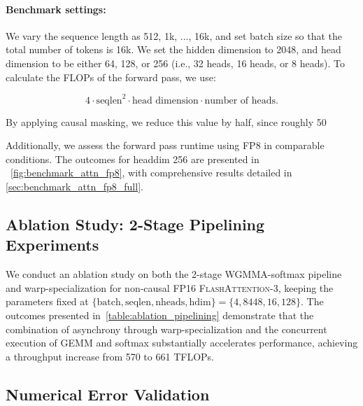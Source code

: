 \begin{enumerate}
\paragraph{Benchmark settings:} We vary the sequence length as 512, 1k, ..., 16k, and set batch size so that the total number of tokens is 16k. We set the hidden dimension to 2048, and head dimension to be either 64, 128, or 256 (i.e., 32 heads, 16 heads, or 8 heads). To calculate the FLOPs of the forward pass, we use:

\begin{equation*}
  4 \cdot \text{seqlen}^2 \cdot \text{head dimension} \cdot \text{number of heads}.
\end{equation*}

By applying causal masking, we reduce this value by half, since roughly 50%

Additionally, we assess the forward pass runtime using FP8 in comparable conditions. The outcomes for headdim 256 are presented in ~\cref{fig:benchmark_attn_fp8}, with comprehensive results detailed in \cref{sec:benchmark_attn_fp8_full}.

\subsection{Ablation Study: 2-Stage Pipelining Experiments}
\label{sec:2-stage-pipelining-experiments}

We conduct an ablation study on both the 2-stage WGMMA-softmax pipeline and warp-specialization for non-causal FP16 \textsc{FlashAttention-3}, keeping the parameters fixed at $\{\text{batch}, \text{seqlen}, \text{nheads}, \text{hdim}\} = \{ 4, 8448, 16, 128\}$. The outcomes presented in~\cref{table:ablation_pipelining} demonstrate that the combination of asynchrony through warp-specialization and the concurrent execution of GEMM and softmax substantially accelerates performance, achieving a throughput increase from 570 to 661 TFLOPs.

\subsection{Numerical Error Validation}
\label{sec:numerical_error}


\end{enumerate}
